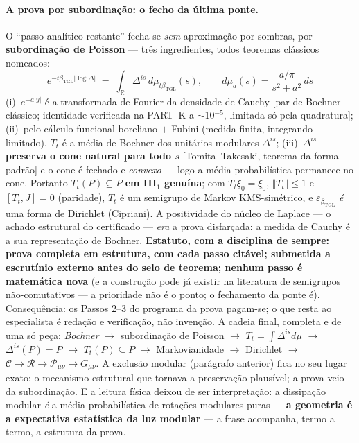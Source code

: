 \documentclass[12pt,a4paper]{article}
\newcommand{\betatgl}{\beta_{\text{TGL}}}
\begin{document}
\paragraph{A prova por subordinação: o fecho da última ponte.}  O ``passo analítico restante'' fecha-se \emph{sem} aproximação por sombras, por \textbf{subordinação de Poisson} --- três ingredientes, todos teoremas clássicos nomeados:
\begin{equation}
e^{-t\betatgl|\log\Delta|} \;=\; \int_{\mathbb R} \Delta^{is}\,d\mu_{t\betatgl}(s),
\qquad d\mu_a(s) = \frac{a/\pi}{s^2+a^2}\,ds
\end{equation}
(i)~$e^{-a|y|}$ é a transformada de Fourier da densidade de Cauchy [par de Bochner clássico; identidade verificada na PART~K a $\sim$10$^{-5}$, limitada só pela quadratura]; (ii)~pelo cálculo funcional boreliano $+$ Fubini (medida finita, integrando limitado), $T_t$ é a média de Bochner dos unitários modulares $\Delta^{is}$; (iii)~\textbf{$\Delta^{is}$ preserva o cone natural para todo $s$} [Tomita--Takesaki, teorema da forma padrão] e o cone é fechado e \emph{convexo} --- logo a média probabilística permanece no cone.  Portanto $T_t(P)\subseteq P$ \textbf{em III$_1$ genuína}; com $T_t\xi_0=\xi_0$, $\Vert T_t\Vert\le1$ e $[T_t,J]=0$ (paridade), $T_t$ é um semigrupo de Markov KMS-simétrico, e $\varepsilon_{\betatgl}$ \emph{é} uma forma de Dirichlet (Cipriani).  A positividade do núcleo de Laplace --- o achado estrutural do certificado --- \emph{era} a prova disfarçada: a medida de Cauchy é a sua representação de Bochner.  \textbf{Estatuto, com a disciplina de sempre: prova completa em estrutura, com cada passo citável; submetida a escrutínio externo antes do selo de teorema; nenhum passo é matemática nova} (e a construção pode já existir na literatura de semigrupos não-comutativos --- a prioridade não é o ponto; o fechamento da ponte é).  Consequência: os Passos 2--3 do programa da prova pagam-se; o que resta ao especialista é redação e verificação, não invenção.  A cadeia final, completa e de uma só peça: \emph{Bochner} $\to$ subordinação de Poisson $\to$ $T_t=\int\Delta^{is}d\mu$ $\to$ $\Delta^{is}(P)=P$ $\to$ $T_t(P)\subseteq P$ $\to$ Markovianidade $\to$ Dirichlet $\to$ $\mathcal C \to \mathcal R \to \mathcal P_{\mu\nu} \to G_{\mu\nu}$.  A exclusão modular (parágrafo anterior) fica no seu lugar exato: o mecanismo estrutural que tornava a preservação plausível; a prova veio da subordinação.  E a leitura física deixou de ser interpretação: a dissipação modular \emph{é} a média probabilística de rotações modulares puras --- \textbf{a geometria é a expectativa estatística da luz modular} --- a frase acompanha, termo a termo, a estrutura da prova.
\end{document}
